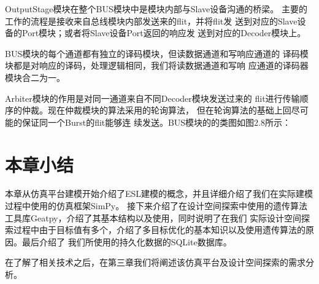 OutputStage模块在整个BUS模块中是模块内部与Slave设备沟通的桥梁。
主要的工作的流程是接收来自总线模块内部发送来的flit，并将flit发
送到对应的Slave设备的Port模块；或者将Slave设备Port返回的响应发
送到对应的Decoder模块上。

BUS模块的每个通道都有独立的译码模块，但读数据通道和写响应通道的
译码模块都是对响应的译码，处理逻辑相同，我们将读数据通道和写响
应通道的译码器模块合二为一。

Arbiter模块的作用是对同一通道来自不同Decoder模块发送过来的
flit进行传输顺序的仲裁。现在仲裁模块的算法采用的轮询算法，
但在轮询算法的基础上回尽可能的保证同一个Burst的flit能够连
续发送。BUS模块的的类图如图2.8所示：

  \section{本章小结}
  本章从仿真平台建模开始介绍了ESL建模的概念，并且详细介绍了我们在实际建模过程中使用的仿真框架SimPy。
  接下来介绍了在设计空间探索中使用的遗传算法工具库Geatpy，介绍了其基本结构以及使用，同时说明了在我们
  实际设计空间探索过程中由于目标值有多个，介绍了多目标优化的基本知识以及使用遗传算法的原因。最后介绍了
  我们所使用的持久化数据的SQLite数据库。

  在了解了相关技术之后，在第三章我们将阐述该仿真平台及设计空间探索的需求分析。


  

